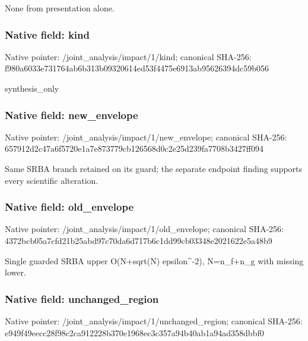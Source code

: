 \documentclass[10pt,a4paper]{article}
\begin{document}
\begingroup\raggedright\sloppy None from presentation alone.\par\endgroup

\subsubsection{Native field: kind}
Native pointer: /joint\_\allowbreak{}analysis/impact/1/kind; canonical SHA-256: f980a6033e731764ab6b313b09320614ed53f4475e6913ab95626394dc59b056

\begingroup\raggedright\sloppy synthesis\_\allowbreak{}only\par\endgroup

\subsubsection{Native field: new\_\allowbreak{}envelope}
Native pointer: /joint\_\allowbreak{}analysis/impact/1/new\_\allowbreak{}envelope; canonical SHA-256: 657912d2c47a6f5720e1a7e873779cb126568d0c2e25d239fa7708b3427ff094

\begingroup\raggedright\sloppy Same SRBA branch retained on its guard;\allowbreak{} the separate endpoint finding supports every scientific alteration.\par\endgroup

\subsubsection{Native field: old\_\allowbreak{}envelope}
Native pointer: /joint\_\allowbreak{}analysis/impact/1/old\_\allowbreak{}envelope; canonical SHA-256: 4372bcb05a7cfd21b25abd97c70da6d717b6c1dd99cb03348e2021622e5a48b9

\begingroup\raggedright\sloppy Single guarded SRBA upper O(N+sqrt(N) epsilon\textasciicircum{}-2),\allowbreak{} N=\allowbreak{}n\_\allowbreak{}f+n\_\allowbreak{}g with missing lower.\par\endgroup

\subsubsection{Native field: unchanged\_\allowbreak{}region}
Native pointer: /joint\_\allowbreak{}analysis/impact/1/unchanged\_\allowbreak{}region; canonical SHA-256: e949f49eecc28f98c2ca912228b370e1968ec3c357a94b40ab1a94ad358dbbf0
\end{document}
